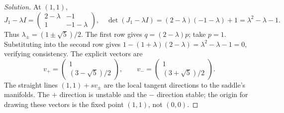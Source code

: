 \documentclass[10pt]{amsart}
\newenvironment{solution}
{\begin{proof}[Solution]}
{\end{proof}}
\begin{document}
\begin{enumerate}[label=\arabic*), leftmargin=*, itemsep=1em]
\begin{solution}
At $(1,1)$,
\[
J_1-\lambda I=\begin{pmatrix}2-\lambda&-1\\1&-1-\lambda\end{pmatrix},
\quad\det(J_1-\lambda I)=(2-\lambda)(-1-\lambda)+1
=\lambda^2-\lambda-1.
\]
Thus $\lambda_\pm=(1\pm\sqrt5)/2$. The first row gives $q=(2-\lambda)p$; take $p=1$. Substituting into the second row gives $1-(1+\lambda)(2-\lambda)=\lambda^2-\lambda-1=0$, verifying consistency. The explicit vectors are
\[
v_+=\begin{pmatrix}1\\(3-\sqrt5)/2\end{pmatrix},\qquad
v_-=\begin{pmatrix}1\\(3+\sqrt5)/2\end{pmatrix}.
\]
The straight lines $(1,1)+sv_\pm$ are the local tangent directions to the saddle's manifolds. The $+$ direction is unstable and the $-$ direction stable; the origin for drawing these vectors is the fixed point $(1,1)$, not $(0,0)$.


\end{solution}
\end{enumerate}
\end{document}
